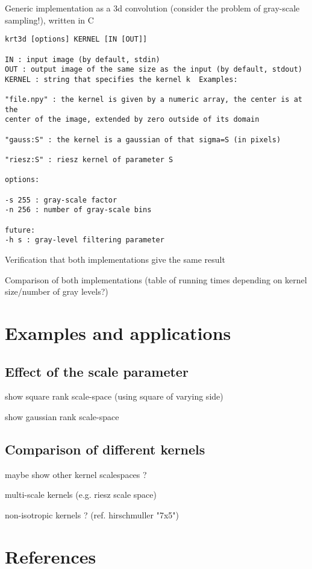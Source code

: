 \documentclass[12pt]{article}                  %
\begin{document}
Generic implementation as a 3d convolution (consider the problem of
gray-scale sampling!), written in C

{\small
\begin{verbatim}
krt3d [options] KERNEL [IN [OUT]]

IN : input image (by default, stdin)
OUT : output image of the same size as the input (by default, stdout)
KERNEL : string that specifies the kernel k  Examples:

"file.npy" : the kernel is given by a numeric array, the center is at the
center of the image, extended by zero outside of its domain

"gauss:S" : the kernel is a gaussian of that sigma=S (in pixels)

"riesz:S" : riesz kernel of parameter S

options:

-s 255 : gray-scale factor
-n 256 : number of gray-scale bins

future:
-h s : gray-level filtering parameter

\end{verbatim}
}

Verification that both implementations give the same result

Comparison of both implementations (table of running times depending on
kernel size/number of gray levels?)

\section{Examples and applications}


\subsection{Effect of the scale parameter}

show square rank scale-space (using square of varying side)

show gaussian rank scale-space


\subsection{Comparison of different kernels}

maybe show other kernel scalespaces ?

multi-scale kernels (e.g. riesz scale space)

non-isotropic kernels ?
(ref. hirschmuller "7x5")



\section{References}
\end{document}
